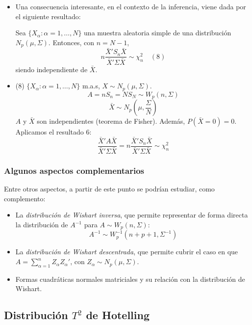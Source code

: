 \documentclass[11pt,a4paper]{article}
\begin{document}
\begin{itemize}
\item Una consecuencia interesante, en el contexto de la inferencia, viene dada por el siguiente resultado:

Sea $\{X_{\alpha}: \alpha=1,\dots,N\}$ una muestra aleatoria simple de una distribución $N_{p}(\mu, \Sigma)$. Entonces, con $n = N-1$,
$$n\frac{\bar{X}'S_{n}\bar{X}}{\bar{X}'\Sigma\bar{X}} \sim \chi_{n}^{2} \quad (8)$$
siendo independiente de $\bar{X}$.

\item (8) $\{X_{\alpha}: \alpha=1, \dots, N\}$ m.a.s, $X \sim N_{p}(\mu, \Sigma)$.
$$A = nS_{n} = NS_{N} \sim W_{p}(n, \Sigma)$$
$$\bar{X} \sim N_{p}(\mu, \frac{\Sigma}{N})$$
$A$ y $\bar{X}$ son independientes (teorema de Fisher). Además, $P(\bar{X}=0)=0$. Aplicamos el resultado 6:
$$\frac{\bar{X}'A\bar{X}}{\bar{X}'\Sigma\bar{X}} = n \frac{\bar{X}'S_{n}\bar{X}}{\bar{X}'\Sigma\bar{X}} \sim \chi_{n}^{2}$$
\end{itemize}

\subsubsection{Algunos aspectos complementarios}
Entre otros aspectos, a partir de este punto se podrían estudiar, como complemento:
\begin{itemize}
\item La \emph{distribución de Wishart inversa}, que permite representar de forma directa la distribución de $A^{-1}$ para $A \sim W_{p}(n, \Sigma)$:
$$A^{-1} \sim W_{p}^{-1}(n+p+1, \Sigma^{-1})$$

\item La \emph{distribución de Wishart descentrada}, que permite cubrir el caso en que $A = \sum_{\alpha=1}^{n} Z_{\alpha}Z_{\alpha}'$, con $Z_{\alpha} \sim N_{p}(\mu, \Sigma)$.

\item Formas cuadráticas normales matriciales y su relación con la distribución de Wishart.
\end{itemize}

\subsection{Distribución \texorpdfstring{$T^{2}$}) de Hotelling}
\end{document}
